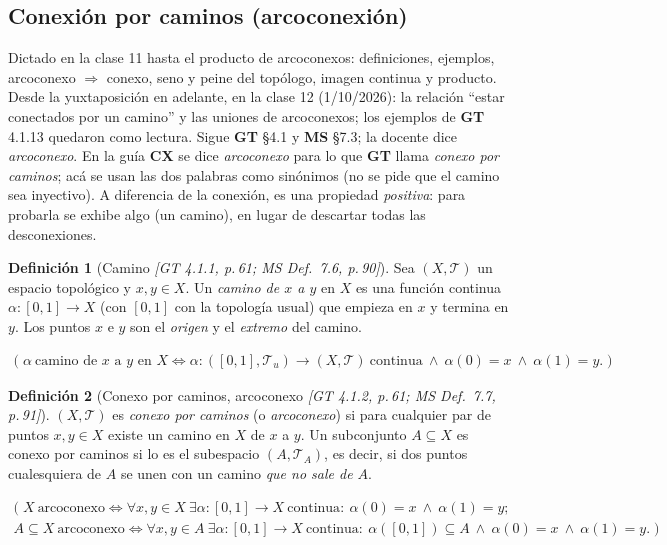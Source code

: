 \documentclass[11pt,a4paper]{article}
\newcommand{\lgc}[1]{\par\vspace{-3pt}\begin{gather*}\big(\;#1\;\big)\end{gather*}\vspace{-6pt}}
\theoremstyle{definition}
\newtheorem{definicion}{Definición}[section]
\theoremstyle{plain}
\newcommand{\fnt}[1]{{\normalfont\small\itshape\color{gray!150!black}[#1]}}
\newcommand{\R}{\mathbb{R}}
\newcommand{\tp}{\mathcal{T}}
\begin{document}

\subsection{Conexión por caminos (arcoconexión)}\label{cc:caminos}

\noindent Dictado en la clase 11 hasta el producto de arcoconexos: definiciones, ejemplos, arcoconexo $\Rightarrow$ conexo, seno y peine del topólogo, imagen continua y producto. Desde la yuxtaposición en adelante, en la clase 12 (1/10/2026): la relación ``estar conectados por un camino'' y las uniones de arcoconexos; los ejemplos de \textbf{GT} 4.1.13 quedaron como lectura. Sigue \textbf{GT} \S4.1 y \textbf{MS} \S7.3; la docente dice \emph{arcoconexo}. En la guía \textbf{CX} se dice \emph{arcoconexo} para lo que \textbf{GT} llama \emph{conexo por caminos}; acá se usan las dos palabras como sinónimos (no se pide que el camino sea inyectivo). A diferencia de la conexión, es una propiedad \emph{positiva}: para probarla se exhibe algo (un camino), en lugar de descartar todas las desconexiones.

\begin{definicion}[Camino \fnt{GT 4.1.1, p.\,61; MS Def.\ 7.6, p.\,90}]\label{cc:defcamino}
Sea $(X,\tp)$ un espacio topológico y $x,y\in X$. Un \emph{camino de $x$ a $y$} en $X$ es una función continua $\alpha:[0,1]\to X$ (con $[0,1]$ con la topología usual) que empieza en $x$ y termina en $y$. Los puntos $x$ e $y$ son el \emph{origen} y el \emph{extremo} del camino.
\lgc{\alpha\ \text{camino de } x \text{ a } y \text{ en } X\iff \alpha:([0,1],\tp_u)\to(X,\tp)\ \text{continua}\ \wedge\ \alpha(0)=x\ \wedge\ \alpha(1)=y.}
\end{definicion}

\begin{definicion}[Conexo por caminos, arcoconexo \fnt{GT 4.1.2, p.\,61; MS Def.\ 7.7, p.\,91}]\label{cc:defarco}
$(X,\tp)$ es \emph{conexo por caminos} (o \emph{arcoconexo}) si para cualquier par de puntos $x,y\in X$ existe un camino en $X$ de $x$ a $y$. Un subconjunto $A\subseteq X$ es conexo por caminos si lo es el subespacio $(A,\tp_A)$, es decir, si dos puntos cualesquiera de $A$ se unen con un camino \emph{que no sale de $A$}.
\lgc{X\ \text{arcoconexo}\iff \forall x,y\in X\ \exists\alpha:[0,1]\to X\ \text{continua}:\ \alpha(0)=x\ \wedge\ \alpha(1)=y;\\
A\subseteq X\ \text{arcoconexo}\iff \forall x,y\in A\ \exists\alpha:[0,1]\to X\ \text{continua}:\ \alpha([0,1])\subseteq A\ \wedge\ \alpha(0)=x\ \wedge\ \alpha(1)=y.}
\end{definicion}
\end{document}
